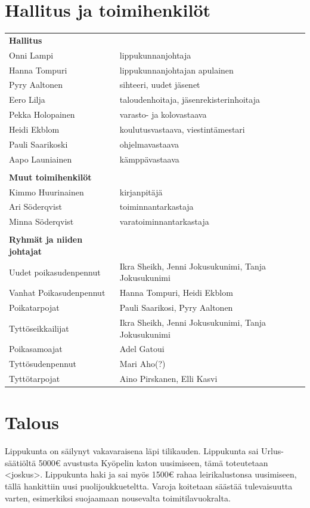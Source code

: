 \documentclass[a4paper, 12pt, finnish]{report} %
\begin{document}
\section{Hallitus ja toimihenkilöt}
\begin{center}
	\begin{tabular}{ l l }
		\textbf{Hallitus} & \\
		Onni Lampi & lippukunnanjohtaja\\
		Hanna Tompuri & lippukunnanjohtajan apulainen\\
		Pyry Aaltonen & sihteeri, uudet jäsenet\\
		Eero Lilja & taloudenhoitaja, jäsenrekisterinhoitaja\\
		Pekka Holopainen & varasto- ja kolovastaava\\
		Heidi Ekblom & koulutusvastaava, viestintämestari\\
		Pauli Saarikoski & ohjelmavastaava\\
		Aapo Launiainen & kämppävastaava\\
					      & \\
		\textbf{Muut toimihenkilöt} & \\
		Kimmo Huurinainen & kirjanpitäjä\\
		Ari Söderqvist & toiminnantarkastaja\\
		Minna Söderqvist & varatoiminnantarkastaja\\
						& \\
		\textbf{Ryhmät ja niiden johtajat} & \\
		Uudet poikasudenpennut & Ikra Sheikh, Jenni Jokusukunimi, Tanja Jokusukunimi\\
		Vanhat Poikasudenpennut & Hanna Tompuri, Heidi Ekblom\\
		Poikatarpojat & Pauli Saarikosi, Pyry Aaltonen\\
		Tyttöseikkailijat & Ikra Sheikh, Jenni Jokusukunimi, Tanja Jokusukunimi\\
		Poikasamoajat & Adel Gatoui\\
		Tyttösudenpennut & Mari Aho(?)\\
		Tyttötarpojat & Aino Pirskanen, Elli Kasvi\\
	\end{tabular}
\end{center}

\newpage
\section{Talous}
Lippukunta on säilynyt vakavaraisena läpi tilikauden. Lippukunta sai Urlus-säätiöltä 5000\euro{} avustusta Kyöpelin katon uusimiseen, tämä toteutetaan <joskus>. Lippukunta haki ja sai myös 1500\euro{} rahaa leirikalustonsa uusimiseen, tällä hankittiin uusi puolijoukkueteltta. Varoja koitetaan säästää tulevaisuutta varten, esimerkiksi suojaamaan nousevalta toimitilavuokralta.
\newpage
\end{document}
